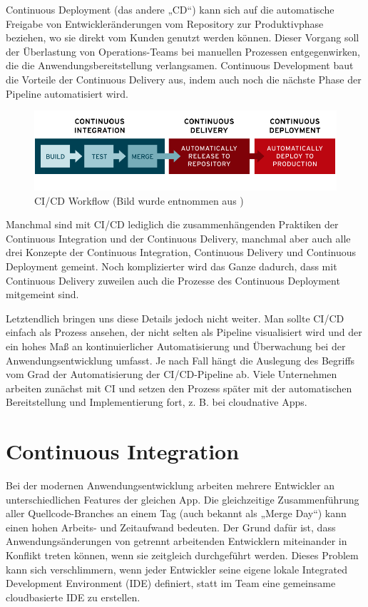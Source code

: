 Continuous Deployment (das andere „CD“) kann sich auf die automatische Freigabe von Entwickleränderungen vom Repository zur Produktivphase beziehen, wo sie direkt vom Kunden genutzt werden können. Dieser Vorgang soll der Überlastung von Operations-Teams bei manuellen Prozessen entgegenwirken, die die Anwendungsbereitstellung verlangsamen. Continuous Development baut die Vorteile der Continuous Delivery aus, indem auch noch die nächste Phase der Pipeline automatisiert wird.\autocite{whatIsCICD}

\begin{figure}[H]
	\centerline{
		\includegraphics[width=1\textwidth, frame]{./grafiken/ci-cd-flow-redhatsource.png}
	}
	\vskip0pt
	\caption{CI/CD Workflow (Bild wurde entnommen aus \cite{whatIsCICD})}
\end{figure}


Manchmal sind mit CI/CD lediglich die zusammenhängenden Praktiken der Continuous Integration und der Continuous Delivery, manchmal aber auch alle drei Konzepte der Continuous Integration, Continuous Delivery und Continuous Deployment gemeint. Noch komplizierter wird das Ganze dadurch, dass mit Continuous Delivery zuweilen auch die Prozesse des Continuous Deployment mitgemeint sind.\autocite{whatIsCICD}

Letztendlich bringen uns diese Details jedoch nicht weiter. Man sollte CI/CD einfach als Prozess ansehen, der nicht selten als Pipeline visualisiert wird und der ein hohes Maß an kontinuierlicher Automatisierung und Überwachung bei der Anwendungsentwicklung umfasst. Je nach Fall hängt die Auslegung des Begriffs vom Grad der Automatisierung der CI/CD-Pipeline ab. Viele Unternehmen arbeiten zunächst mit CI und setzen den Prozess später mit der automatischen Bereitstellung und Implementierung fort, z. B. bei cloudnative Apps.\autocite{whatIsCICD}

\section{Continuous Integration}

Bei der modernen Anwendungsentwicklung arbeiten mehrere Entwickler an unterschiedlichen Features der gleichen App. Die gleichzeitige Zusammenführung aller Quellcode-Branches an einem Tag (auch bekannt als „Merge Day“) kann einen hohen Arbeits- und Zeitaufwand bedeuten. Der Grund dafür ist, dass Anwendungsänderungen von getrennt arbeitenden Entwicklern miteinander in Konflikt treten können, wenn sie zeitgleich durchgeführt werden. Dieses Problem kann sich verschlimmern, wenn jeder Entwickler seine eigene lokale Integrated Development Environment (IDE) definiert, statt im Team eine gemeinsame cloudbasierte IDE zu erstellen.\autocite{whatIsCICD}

